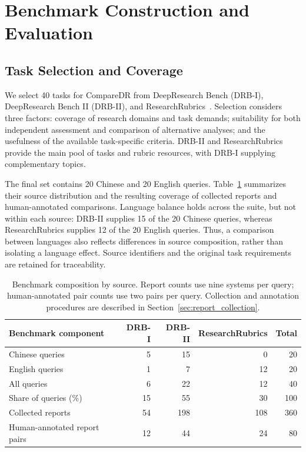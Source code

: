 \documentclass{article}
\begin{document}
\section{Benchmark Construction and Evaluation}
\label{sec:method}

\subsection{Task Selection and Coverage}
\label{sec:task_selection}
We select 40 tasks for CompareDR from DeepResearch Bench (DRB-I), DeepResearch Bench II (DRB-II), and ResearchRubrics~\citep{drb12025,drb22026,ResearchRubrics2025}. Selection considers three factors: coverage of research domains and task demands; suitability for both independent assessment and comparison of alternative analyses; and the usefulness of the available task-specific criteria. DRB-II and ResearchRubrics provide the main pool of tasks and rubric resources, with DRB-I supplying complementary topics.

The final set contains 20 Chinese and 20 English queries. Table~\ref{tab:benchmark_resources} summarizes their source distribution and the resulting coverage of collected reports and human-annotated comparisons. Language balance holds across the suite, but not within each source: DRB-II supplies 15 of the 20 Chinese queries, whereas ResearchRubrics supplies 12 of the 20 English queries. Thus, a comparison between languages also reflects differences in source composition, rather than isolating a language effect. Source identifiers and the original task requirements are retained for traceability.

\begin{table}[htbp]
\centering
\small
\begin{tabular*}{\linewidth}{@{\extracolsep{\fill}}lrrrr@{}}
\toprule
Benchmark component & DRB-I & DRB-II & ResearchRubrics & Total \\
\midrule
Chinese queries & 5 & 15 & 0 & 20 \\
English queries & 1 & 7 & 12 & 20 \\
All queries & 6 & 22 & 12 & 40 \\
Share of queries (\%) & 15 & 55 & 30 & 100 \\
\midrule
Collected reports & 54 & 198 & 108 & 360 \\
Human-annotated report pairs & 12 & 44 & 24 & 80 \\
\bottomrule
\end{tabular*}
\caption{Benchmark composition by source. Report counts use nine systems per query; human-annotated pair counts use two pairs per query. Collection and annotation procedures are described in Section~\ref{sec:report_collection}.}
\label{tab:benchmark_resources}
\end{table}
\end{document}
